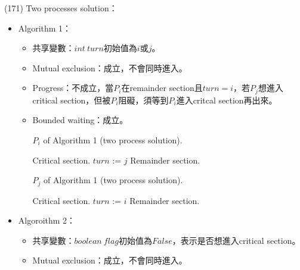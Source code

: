 \begin{theorem}{(171)} Two processes solution：\begin{itemize}
        \item Algorithm 1：\begin{itemize}
            \item 共享變數：$int \ turn$初始值為$i$或$j$。
            \item Mutual exclusion：成立，不會同時進入。
            \item Progress：不成立，當$P_i$在remainder section且$turn = i$，若$P_j$想進入critical section，但被$P_i$阻礙，須等到$P_i$進入critcal section再出來。
            \item Bounded waiting：成立。
            \begin{algorithm}[H]
                \caption{$P_i$ of Algorithm 1 (two process solution).}
                \begin{algorithmic}[1]
                        \Repeat 
                            \EndWhile
                            \State Critical section.
                            \State $turn$ := $j$
                            \State Remainder section.
                    \EndFunction
                \end{algorithmic}
            \end{algorithm} 
            \begin{algorithm}[H]
                \caption{$P_j$ of Algorithm 1 (two process solution).}
                \begin{algorithmic}[1]
                        \Repeat 
                            \EndWhile
                            \State Critical section.
                            \State $turn$ := $i$
                            \State Remainder section.
                    \EndFunction
                \end{algorithmic}
            \end{algorithm} 
        \end{itemize}
        \item Algoroithm 2：\begin{itemize}
            \item 共享變數：$boolean \ flag$初始值為$False$，表示是否想進入critical section。
            \item Mutual exclusion：成立，不會同時進入。

\end{itemize}
\end{itemize}
\end{theorem}
